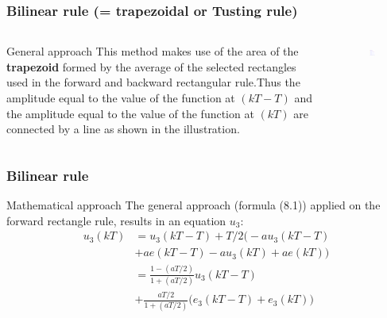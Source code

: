 \begin{frame}
	\frametitle{Bilinear rule (= trapezoidal or Tusting rule)}
\begin{columns}
	\begin{column}{0.5\textwidth}
		\begin{block}{General approach}
			This method makes use of the area of the \textbf{trapezoid} formed by the average of the selected rectangles used in the forward and backward rectangular rule.Thus the amplitude equal to the value of the function at $(kT - T)$ and the amplitude equal to the value of the function at $(kT)$ are connected by a line as shown in the illustration.
		\end{block}	
	\end{column}

	\begin{column}{0.5\textwidth}
		\begin{figure}
			\centering
			\includegraphics[width=1\linewidth]{Trapezium}
		\end{figure}
	\end{column}	
	
\end{columns}
\end{frame}

\begin{frame}
	\frametitle{Bilinear rule}
	\begin{block}{Mathematical approach}
		The general approach (formula (8.1)) applied on the forward rectangle rule, results in an equation $u_3$:
		\begin{align*}
		u_3(kT)& =u_3(kT - T) + T/2\big(-au_3(kT - T)\\
		& + ae(kT - T) - au_3(kT) + ae(kT)\big)\\
		& =\frac{1-(aT/2)}{1 + (aT/2)}u_3(kT - T)\\
		& +\frac{aT/2}{1 + (aT/2)} \big(e_3(kT - T) + e_3(kT)\big)
		\end{align*}
	\end{block}
\end{frame}

